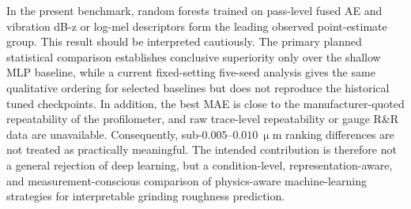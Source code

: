 In the present benchmark, random forests trained on pass-level fused AE and vibration dB-z or log-mel descriptors form the leading observed point-estimate group. This result should be interpreted cautiously. The primary planned statistical comparison establishes conclusive superiority only over the shallow MLP baseline, while a current fixed-setting five-seed analysis gives the same qualitative ordering for selected baselines but does not reproduce the historical tuned checkpoints. In addition, the best MAE is close to the manufacturer-quoted repeatability of the profilometer, and raw trace-level repeatability or gauge R\&R data are unavailable. Consequently, sub-\(0.005\)--\(0.010~\upmu\)m ranking differences are not treated as practically meaningful. The intended contribution is therefore not a general rejection of deep learning, but a condition-level, representation-aware, and measurement-conscious comparison of physics-aware machine-learning strategies for interpretable grinding roughness prediction.
